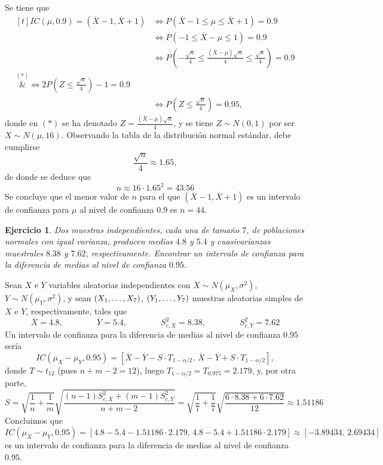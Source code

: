\documentclass[11pt]{report}
\makeatletter
\renewenvironment{proof}[1][\proofname]{\par
  \pushQED{\qed}%
  \normalfont \topsep\z@skip %
  \trivlist
  \item[\hskip\labelsep
        \itshape
    #1\@addpunct{.}]\ignorespaces
}{%
  \popQED\endtrivlist\@endpefalse
}
\newtheorem{ejercicio}{Ejercicio}
\makeatother
\begin{document}
\begin{proof}
Se tiene que
\[\begin{aligned}[t]
IC(\mu,0.9) = (\overline{X}-1,\overline{X}+1) &\iff P(\overline{X}-1 \leq \mu \leq \overline{X}+1) = 0.9 \\ &\iff P(-1 \leq\overline{X} -\mu \leq 1) = 0.9 \\ &\iff P\left(-\frac{\sqrt{n}}{4} \leq\frac{(\overline{X} -\mu)\sqrt{n}}{4} \leq \frac{\sqrt{n}}{4}\right) = 0.9 \\ \overset{(*)}&{\iff} 2P\left(Z \leq \frac{\sqrt{n}}{4}\right) -1= 0.9 \\ &\iff P\left(Z \leq \frac{\sqrt{n}}{4}\right) = 0.95,
\end{aligned}\]  
donde en $(*)$ se ha denotado $Z = \frac{(\overline{X}-\mu)\sqrt{n}}{4}$, y se tiene $Z \sim N(0,1)$ por ser $X \sim N(\mu,16)$. Observando la tabla de la distribución normal estándar, debe cumplirse
\[\frac{\sqrt{n}}{4} \approx 1.65,\]
de donde se deduce que
\[n \approx 16 \cdot 1.65^2 =43.56\]
Se concluye que el menor valor de $n$ para el que $(\overline{X}-1,\overline{X}+1)$ es un intervalo de confianza para $\mu$ al nivel de confianza $0.9$ es $n = 44$.
\end{proof}

\begin{ejercicio}
  Dos muestras independientes, cada una de tamaño $7$, de poblaciones normales con igual varianza, producen medias $4.8$ y $5.4$ y cuasivarianzas muestrales $8.38$ y $7.62$, respectivamente. Encontrar un intervalo de confianza para la diferencia de medias al nivel de confianza $0.95$.
\end{ejercicio}

\begin{proof}
Sean $X$ e $Y$ variables aleatorias independientes con $X \sim N(\mu_X,\sigma^2)$, $Y \sim N(\mu_Y,\sigma^2)$, y sean $(X_1,\mathellipsis,X_7)$, $(Y_1,\mathellipsis,Y_7)$ muestras aleatorias simples de $X$ e $Y$, respectivamente, tales que \[\overline{X} = 4.8, \qquad\qquad \overline{Y} = 5.4, \qquad\qquad S^2_{c,X} = 8.38, \qquad\qquad S^2_{c,Y} = 7.62\]
Un intervalo de confianza para la diferencia de medias al nivel de confianza $0.95$ sería
\[IC(\mu_X-\mu_Y,0.95) = \left[\overline{X}-\overline{Y}-S \cdot T_{1-\alpha/2}, \, \overline{X}-\overline{Y}+S \cdot T_{1-\alpha/2}\right],\]
donde $T \sim t_{12}$ (pues $n+m-2=12$), luego $T_{1-\alpha/2} = T_{0.975} = 2.179$, y, por otra parte,
  \[S = \sqrt{\frac{1}{n}+\frac{1}{m}}\sqrt{\frac{(n-1)S^2_{c,X}+(m-1)S^2_{c,Y}}{n+m-2}} = \sqrt{\frac{1}{7}+\frac{1}{7}}\sqrt{\frac{6 \cdot 8.38 + 6 \cdot 7.62}{12}} \approx 1.51186\]
  Concluimos que
  \[IC(\mu_X-\mu_Y,0.95) = \left[4.8-5.4-1.51186\cdot 2.179, \, 4.8-5.4+1.51186\cdot 2.179\right] \approx \left[-3.89434, \, 2.69434\right]\]
  es un intervalo de confianza para la diferencia de medias al nivel de confianza $0.95$.
\end{proof}
\end{document}
